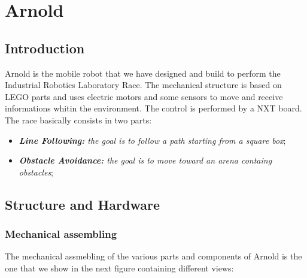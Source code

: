 \documentclass[a4paper,11pt,oneside]{book}
\begin{document}
\newpage
\thispagestyle{empty}



\tableofcontents \thispagestyle{empty}
\listoffigures\thispagestyle{empty}



\chapter{Arnold}

\section*{Introduction}

Arnold is the mobile robot that we have designed and build to perform the Industrial Robotics Laboratory Race. The mechanical structure is based on LEGO parts and uses electric motors and some sensors to move and receive informations whitin the environment. The control is performed by a NXT board. The race basically consists in two parts:
\begin{itemize}
	\item \textit{ \textbf {Line Following:} the goal is to follow a path starting from a square box};
	\item \textit{\textbf {Obstacle Avoidance:} the goal is to move toward an arena containg obstacles};

\end{itemize}
\section{Structure and Hardware}
\subsection {Mechanical assembling}

The mechanical assmebling of the various parts and components of Arnold is the one that we show in the next figure containing different views:\\
\end{document}
